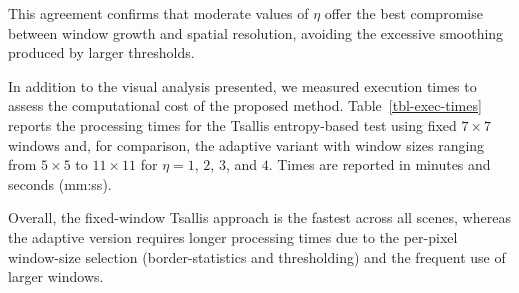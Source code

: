 \documentclass[
  lettersize  journal,
]{IEEEtran}%
\providecommand{\DIFaddtex}[1]{{\protect\color{blue}\uwave{#1}}} %
\providecommand{\DIFaddFL}[1]{\DIFadd{#1}} %
\providecommand{\DIFaddbeginFL}{} %
\providecommand{\DIFaddendFL}{} %
\providecommand{\DIFadd}[1]{\texorpdfstring{\DIFaddtex{#1}}{#1}} %
\providecommand{\DIFaddincludegraphics}[2][]{{\color{blue}\fbox{\DIFOincludegraphics[#1]{#2}}}} %
\DeclareRobustCommand{\DIFaddbeginFL}{\DIFOaddbeginFL \let\includegraphics\DIFaddincludegraphics} %
\DeclareRobustCommand{\DIFaddendFL}{\DIFOaddendFL \let\includegraphics\DIFOincludegraphics} %
\begin{document}
This agreement confirms that moderate values of \(\eta\) offer the best
compromise between window growth and spatial resolution, avoiding the
excessive smoothing produced by larger thresholds.

In addition to the visual analysis presented, we measured execution
times to assess the computational cost of the proposed method.
Table~\ref{tbl-exec-times} reports the processing times for the Tsallis
entropy-based test using fixed \(7\times7\) windows and, for comparison,
the adaptive variant with window sizes ranging from \(5\times5\) to
\(11\times11\) for \(\eta=1\), \(2\), \(3\), and \(4\). Times are
reported in minutes and seconds (mm:ss).

\renewcommand{\arraystretch}{1.4}

\begin{table}[hbt]

\caption{\label{tbl-exec-times}Execution times for heterogeneity
detection using fixed and adaptive windows\DIFaddbeginFL \DIFaddFL{.}\DIFaddendFL }


\end{table}%

Overall, the fixed-window Tsallis approach is the fastest across all
scenes, whereas the adaptive version requires longer processing times
due to the per-pixel window-size selection (border-statistics and
thresholding) and the frequent use of larger windows.
\end{document}
